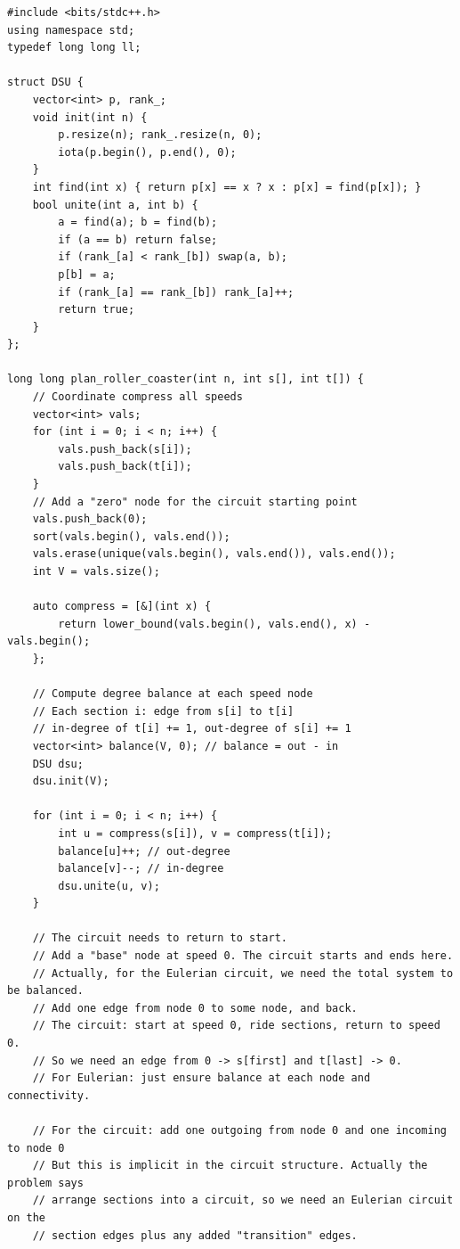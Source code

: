 \documentclass[11pt,a4paper]{article}
\begin{document}
\begin{lstlisting}
#include <bits/stdc++.h>
using namespace std;
typedef long long ll;

struct DSU {
    vector<int> p, rank_;
    void init(int n) {
        p.resize(n); rank_.resize(n, 0);
        iota(p.begin(), p.end(), 0);
    }
    int find(int x) { return p[x] == x ? x : p[x] = find(p[x]); }
    bool unite(int a, int b) {
        a = find(a); b = find(b);
        if (a == b) return false;
        if (rank_[a] < rank_[b]) swap(a, b);
        p[b] = a;
        if (rank_[a] == rank_[b]) rank_[a]++;
        return true;
    }
};

long long plan_roller_coaster(int n, int s[], int t[]) {
    // Coordinate compress all speeds
    vector<int> vals;
    for (int i = 0; i < n; i++) {
        vals.push_back(s[i]);
        vals.push_back(t[i]);
    }
    // Add a "zero" node for the circuit starting point
    vals.push_back(0);
    sort(vals.begin(), vals.end());
    vals.erase(unique(vals.begin(), vals.end()), vals.end());
    int V = vals.size();

    auto compress = [&](int x) {
        return lower_bound(vals.begin(), vals.end(), x) - vals.begin();
    };

    // Compute degree balance at each speed node
    // Each section i: edge from s[i] to t[i]
    // in-degree of t[i] += 1, out-degree of s[i] += 1
    vector<int> balance(V, 0); // balance = out - in
    DSU dsu;
    dsu.init(V);

    for (int i = 0; i < n; i++) {
        int u = compress(s[i]), v = compress(t[i]);
        balance[u]++; // out-degree
        balance[v]--; // in-degree
        dsu.unite(u, v);
    }

    // The circuit needs to return to start.
    // Add a "base" node at speed 0. The circuit starts and ends here.
    // Actually, for the Eulerian circuit, we need the total system to be balanced.
    // Add one edge from node 0 to some node, and back.
    // The circuit: start at speed 0, ride sections, return to speed 0.
    // So we need an edge from 0 -> s[first] and t[last] -> 0.
    // For Eulerian: just ensure balance at each node and connectivity.

    // For the circuit: add one outgoing from node 0 and one incoming to node 0
    // But this is implicit in the circuit structure. Actually the problem says
    // arrange sections into a circuit, so we need an Eulerian circuit on the
    // section edges plus any added "transition" edges.


\end{lstlisting}
\end{document}
